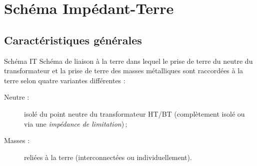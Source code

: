 

\begin{comment}

\documentclass[a4paper, 11pt, twoside, fleqn]{memoir}

\usepackage{AOCDTF}

\marqueurchapitre
\decoupagechapitre{1} %


	\openleft %

\end{comment}

\chapter{Schéma Impédant-Terre\label{chap:schema_it}}
\ChapFrame

\section{Caractéristiques générales}

\begin{definition}{Schéma IT}{}
Schéma de liaison à la terre dans lequel le prise de terre du neutre du transformateur et la prise de terre des masses métalliques sont raccordées à la terre selon quatre variantes différentes :
\begin{description}
\item [Neutre :] isolé du point neutre du transformateur HT/BT (complètement isolé ou via une \emph{impédance de limitation})\,;
\item [Masses :] reliées à la terre (interconnectées ou individuellement).
\end{description}
\end{definition}


